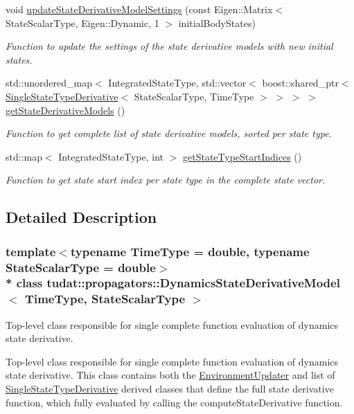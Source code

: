 \begin{DoxyCompactItemize}
void \hyperlink{classtudat_1_1propagators_1_1DynamicsStateDerivativeModel_a1d4abdeced7b583e47be6ee78279932b}{update\+State\+Derivative\+Model\+Settings} (const Eigen\+::\+Matrix$<$ State\+Scalar\+Type, Eigen\+::\+Dynamic, 1 $>$ initial\+Body\+States)
\begin{DoxyCompactList}\small\item\em Function to update the settings of the state derivative models with new initial states. \end{DoxyCompactList}\item 
std\+::unordered\+\_\+map$<$ Integrated\+State\+Type, std\+::vector$<$ boost\+::shared\+\_\+ptr$<$ \hyperlink{classtudat_1_1propagators_1_1SingleStateTypeDerivative}{Single\+State\+Type\+Derivative}$<$ State\+Scalar\+Type, Time\+Type $>$ $>$ $>$ $>$ \hyperlink{classtudat_1_1propagators_1_1DynamicsStateDerivativeModel_a7c745cdbe25e01614d9900c60bbb8dca}{get\+State\+Derivative\+Models} ()
\begin{DoxyCompactList}\small\item\em Function to get complete list of state derivative models, sorted per state type. \end{DoxyCompactList}\item 
std\+::map$<$ Integrated\+State\+Type, int $>$ \hyperlink{classtudat_1_1propagators_1_1DynamicsStateDerivativeModel_a97bc8765abade5ac2da90ef94813d649}{get\+State\+Type\+Start\+Indices} ()
\begin{DoxyCompactList}\small\item\em Function to get state start index per state type in the complete state vector. \end{DoxyCompactList}\end{DoxyCompactItemize}


\subsection{Detailed Description}
\subsubsection*{template$<$typename Time\+Type = double, typename State\+Scalar\+Type = double$>$\\*
class tudat\+::propagators\+::\+Dynamics\+State\+Derivative\+Model$<$ Time\+Type, State\+Scalar\+Type $>$}

Top-\/level class responsible for single complete function evaluation of dynamics state derivative. 

Top-\/level class responsible for single complete function evaluation of dynamics state derivative. This class contains both the \hyperlink{classtudat_1_1propagators_1_1EnvironmentUpdater}{Environment\+Updater} and list of \hyperlink{classtudat_1_1propagators_1_1SingleStateTypeDerivative}{Single\+State\+Type\+Derivative} derived classes that define the full state derivative function, which fully evaluated by calling the compute\+State\+Derivative function. 

